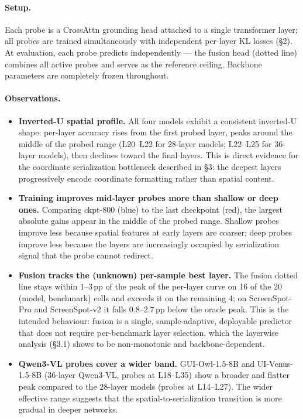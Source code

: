 \paragraph{Setup.}
Each probe is a CrossAttn grounding head attached to a single transformer layer; all probes are trained simultaneously with independent per-layer KL losses (\S2).
At evaluation, each probe predicts independently — the fusion head (dotted line) combines all active probes and serves as the reference ceiling.
Backbone parameters are completely frozen throughout.

\paragraph{Observations.}

\begin{itemize}

 \item \textbf{Inverted-U spatial profile.}
 All four models exhibit a consistent inverted-U shape: per-layer accuracy rises from the first probed layer, peaks around the middle of the probed range (L20--L22 for 28-layer models; L22--L25 for 36-layer models), then declines toward the final layers.
 This is direct evidence for the coordinate serialization bottleneck described in \S3: the deepest layers progressively encode coordinate formatting rather than spatial content.

 \item \textbf{Training improves mid-layer probes more than shallow or deep ones.}
 Comparing ckpt-800 (blue) to the last checkpoint (red), the largest absolute gains appear in the middle of the probed range.
 Shallow probes improve less because spatial features at early layers are coarser; deep probes improve less because the layers are increasingly occupied by serialization signal that the probe cannot redirect.

 \item \textbf{Fusion tracks the (unknown) per-sample best layer.}
 The fusion dotted line stays within $1$--$3$\,pp of the peak of the per-layer curve on 16 of the 20 (model, benchmark) cells and exceeds it on the remaining 4; on ScreenSpot-Pro and ScreenSpot-v2 it falls $0.8$--$2.7$\,pp below the oracle peak.
 This is the intended behaviour: fusion is a single, sample-adaptive, deployable predictor that does not require per-benchmark layer selection, which the layerwise analysis (\S3.1) shows to be non-monotonic and backbone-dependent.

 \item \textbf{Qwen3-VL probes cover a wider band.}
 GUI-Owl-1.5-8B and UI-Venus-1.5-8B (36-layer Qwen3-VL, probes at L18--L35) show a broader and flatter peak compared to the 28-layer models (probes at L14--L27).
 The wider effective range suggests that the spatial-to-serialization transition is more gradual in deeper networks.

\end{itemize}

